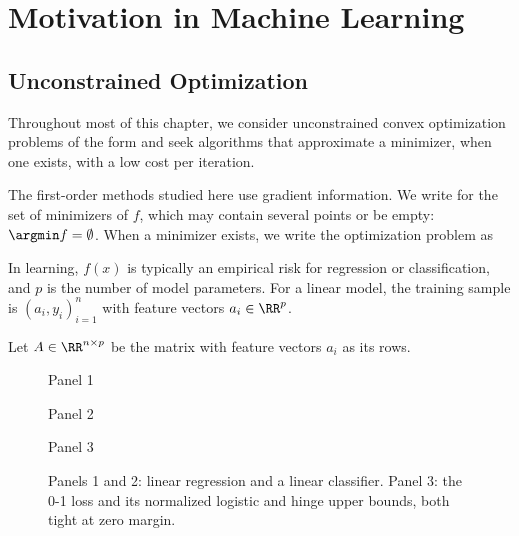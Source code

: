 \section{Motivation in Machine Learning}

                                                                                  
\subsection{Unconstrained Optimization}

Throughout most of this chapter, we consider unconstrained convex optimization problems of the form
and seek algorithms that approximate a minimizer, when one exists, with a low cost per iteration.
 
The first-order methods studied here use gradient information. We write
for the set of minimizers of $f$, which may contain several points or be empty: $\argmin f = \emptyset$. When a minimizer exists, we write the optimization problem as


In learning, $f(x)$ is typically an empirical risk for regression or classification, and $p$ is the number of model parameters. For a linear model, the training sample is $(a_i,y_i)_{i=1}^n$ with feature vectors $a_i \in \RR^p$.
 
Let $A \in \RR^{n \times p}$ be the matrix with feature vectors $a_i$ as its rows.


\begin{figure}[tbp]
\centering
{\small\sffamily\color{BookMuted}Panel 1\par}\smallskip
{}
\par\medskip
{\small\sffamily\color{BookMuted}Panel 2\par}\smallskip
{}
\par\medskip
{\small\sffamily\color{BookMuted}Panel 3\par}\smallskip
{}
\caption{Panels 1 and 2: linear regression and a linear classifier. Panel 3: the 0-1 loss and its normalized logistic and hinge upper bounds, both tight at zero margin.}
\label{fig-ml-ex}
\end{figure}


